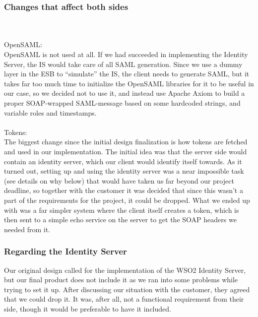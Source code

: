 \subsubsection{Changes that affect both sides}\label{Changes:both}
\\\\
OpenSAML:\\
OpenSAML is not used at all. If we had succeeded in implementing the Identity Server, the IS would take care of all SAML generation. Since we use a dummy layer in the ESB to “simulate” the IS, the client needs to generate SAML, but it takes far too much time to initialize the OpenSAML libraries for it to be useful in our case, so we decided not to use it, and instead use Apache Axiom to build a proper SOAP-wrapped SAML-message based on some hardcoded strings, and variable roles and timestamps.
\\\\
Tokens:\\
The biggest change since the initial design finalization is how tokens are fetched and used in our implementation. The initial idea was that the server side would contain an identity server, which our client would identify itself towards. As it turned out, setting up and using the identity server was a near impossible task (see details on why below) that would have taken us far beyond our project deadline, so together with the customer it was decided that since this wasn't a part of the requirements for the project, it could be dropped. What we ended up with was a far simpler system where the client itself creates a token, which is then sent to a simple echo service on the server to get the SOAP headers we needed from it.\\

\subsubsection{Regarding the Identity Server}\label{Changes:IS}

Our original design called for the implementation of the WSO2 Identity Server, but our final product does not include it as we ran into some problems while trying to set it up. After discussing our situation with the customer, they agreed that we could drop it. It was, after all, not a functional requirement from their side, though it would be preferable to have it included.

